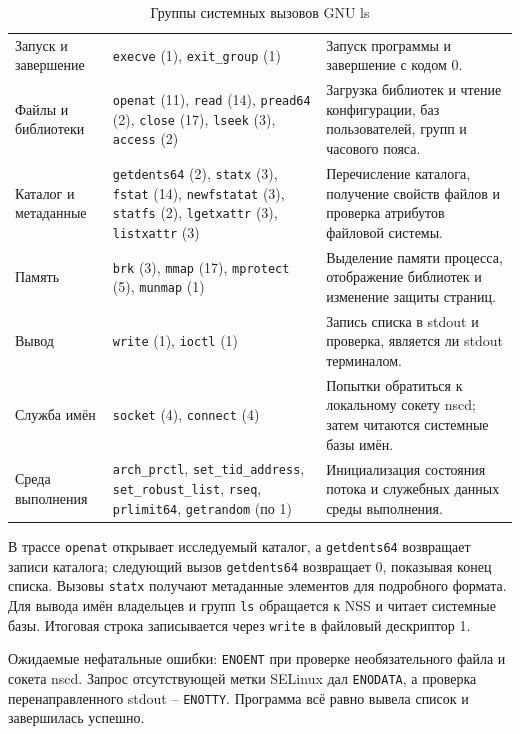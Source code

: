 \documentclass[12pt,a4paper]{article}
\begin{document}
\begin{table}[H]
\caption{Группы системных вызовов GNU ls}
\small
\begin{tabularx}{\linewidth}{|P{3.1cm}|P{6.3cm}|L|}
\hline
{} &  & \tabularnewline \hline
Запуск и завершение & \texttt{execve} (1), \texttt{exit\_group} (1) & Запуск программы и завершение с кодом 0. \\ \hline
Файлы и библиотеки & \texttt{openat} (11), \texttt{read} (14), \texttt{pread64} (2), \texttt{close} (17), \texttt{lseek} (3), \texttt{access} (2) & Загрузка библиотек и чтение конфигурации, баз пользователей, групп и часового пояса. \\ \hline
Каталог и метаданные & \texttt{getdents64} (2), \texttt{statx} (3), \texttt{fstat} (14), \texttt{newfstatat} (3), \texttt{statfs} (2), \texttt{lgetxattr} (3), \texttt{listxattr} (3) & Перечисление каталога, получение свойств файлов и проверка атрибутов файловой системы. \\ \hline
Память & \texttt{brk} (3), \texttt{mmap} (17), \texttt{mprotect} (5), \texttt{munmap} (1) & Выделение памяти процесса, отображение библиотек и изменение защиты страниц. \\ \hline
Вывод & \texttt{write} (1), \texttt{ioctl} (1) & Запись списка в stdout и проверка, является ли stdout терминалом. \\ \hline
Служба имён & \texttt{socket} (4), \texttt{connect} (4) & Попытки обратиться к локальному сокету nscd; затем читаются системные базы имён. \\ \hline
Среда выполнения & \texttt{arch\_prctl}, \texttt{set\_tid\_address}, \texttt{set\_robust\_list}, \texttt{rseq}, \texttt{prlimit64}, \texttt{getrandom} (по 1) & Инициализация состояния потока и служебных данных среды выполнения. \\ \hline
\end{tabularx}
\end{table}

В трассе \texttt{openat} открывает исследуемый каталог, а \texttt{getdents64} возвращает записи каталога; следующий вызов \texttt{getdents64} возвращает 0, показывая конец списка. Вызовы \texttt{statx} получают метаданные элементов для подробного формата. Для вывода имён владельцев и групп \texttt{ls} обращается к NSS и читает системные базы. Итоговая строка записывается через \texttt{write} в файловый дескриптор 1.

Ожидаемые нефатальные ошибки: \texttt{ENOENT} при проверке необязательного файла и сокета nscd. Запрос отсутствующей метки SELinux дал \texttt{ENODATA}, а проверка перенаправленного stdout -- \texttt{ENOTTY}. Программа всё равно вывела список и завершилась успешно.
\end{document}
